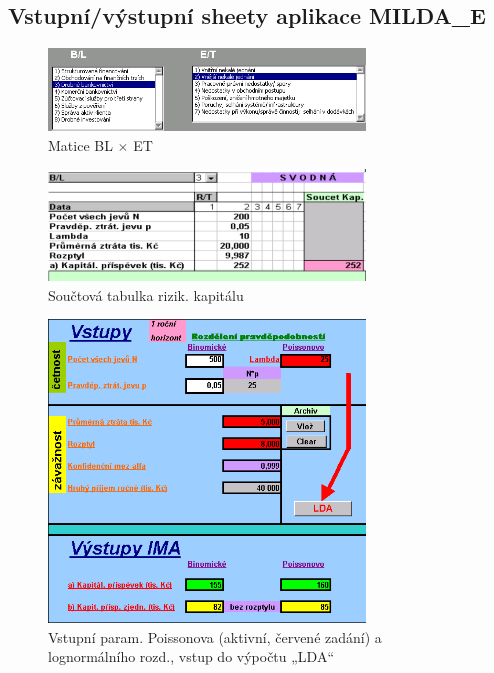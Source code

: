 \documentclass{article}
\begin{document}
\subsection{Vstupní/výstupní sheety aplikace MILDA\_E}

\begin{figure}[H]
  \caption{Matice BL $\times$ ET}
  \centering
    \includegraphics[width=0.75\textwidth]{matice}
\end{figure}


\begin{figure}[H]
  \caption{Součtová tabulka rizik. kapitálu}
  \centering
    \includegraphics[width=0.75\textwidth]{tabulka}
\end{figure}

\begin{figure}[H]
    \caption{Vstupní param. Poissonova (aktivní, červené zadání) a lognormálního rozd., vstup do výpočtu „LDA“}    
  \centering
    \includegraphics[width=0.75\textwidth]{vstup}

\end{figure}
\end{document}
